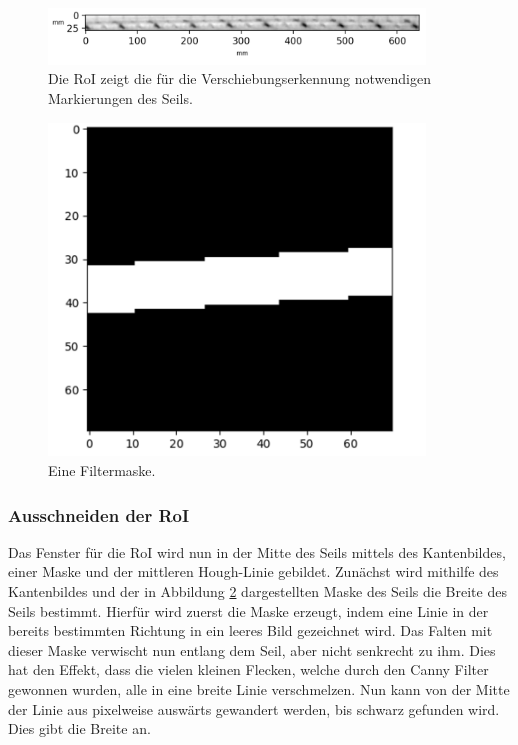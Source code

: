 \documentclass[10pt,a4paper]{scrarticle}
\begin{document}
\begin{figure}
\includegraphics[width=10cm]{Abbildungen/RoI_scales.png}
  \centering
  \caption{Die RoI zeigt die für die Verschiebungserkennung notwendigen Markierungen des Seils.}
  \label{fig:RoI_img}
\end{figure}
    

\begin{figure}
\includegraphics[width=10cm]{Abbildungen/filterMask.png}
  \centering
  \caption{Eine Filtermaske.}
  \label{fig:filtermaske}
\end{figure}

		\subsubsection{Ausschneiden der RoI}\label{RoI_Ausschneiden}
		Das Fenster für die RoI wird nun in der Mitte des Seils mittels des Kantenbildes, einer Maske und der mittleren Hough-Linie gebildet. Zunächst wird mithilfe des Kantenbildes und der in Abbildung \ref{fig:filtermaske} dargestellten Maske des Seils die Breite des Seils bestimmt. Hierfür wird zuerst die Maske erzeugt, indem eine Linie in der bereits bestimmten Richtung in ein leeres Bild gezeichnet wird. Das Falten mit dieser Maske verwischt nun entlang dem Seil, aber nicht senkrecht zu ihm. Dies hat den Effekt, dass die vielen kleinen Flecken, welche durch den Canny Filter gewonnen wurden, alle in eine breite Linie verschmelzen. Nun kann von der Mitte der Linie aus pixelweise auswärts gewandert werden, bis schwarz gefunden wird. Dies gibt die Breite an.
		
\end{document}
